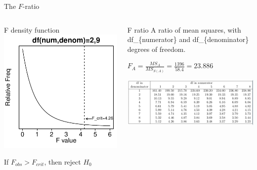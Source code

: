 \documentclass[presentation]{beamer}
\begin{document}
\begin{frame}[label={sec:orge81a0ef}]{The \(F\)-ratio}
\begin{columns}
\begin{column}{.4\columnwidth}
\begin{block}{F density function}
\includegraphics[width=.9\linewidth]{f-ratio.pdf}

If \(F_{obs} > F_{crit}\), then reject \(H_0\)
\end{block}
\end{column}

\begin{column}{.58\columnwidth}
\begin{block}{F ratio}
A ratio of mean squares, with df\_\{numerator\} and df\_\{denominator\} degrees of freedom.

\(F_A = \frac{MS_A}{MS_{S(A)}} = \frac{1396}{58.4} = 23.886\)
\end{block}

\includegraphics[width=.9\linewidth]{08_glm_img/ftable.jpg}
\end{column}
\end{columns}
\end{frame}
\end{document}
